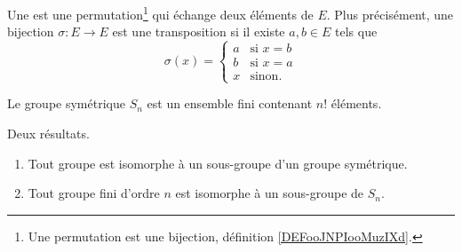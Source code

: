 \begin{definition}      \label{DEFooXNAFooGTbTTJ}
    Une  est une permutation\footnote{Une permutation est une bijection, définition \ref{DEFooJNPIooMuzIXd}.} qui échange deux éléments de \( E\). Plus précisément, une bijection \( \sigma\colon E\to E\) est une transposition si il existe \( a,b\in E\) tels que
    \begin{equation}
        \sigma(x)=\begin{cases}
              a  &   \text{si } x=b\\
            b    &   \text{si } x=a\\
            x    &    \text{sinon. }
        \end{cases}
    \end{equation}
\end{definition}

\begin{lemma}        \label{LEMooSGWKooKFIDyT}
    Le groupe symétrique \( S_n\) est un ensemble fini contenant \( n!\) éléments.
\end{lemma}

\begin{lemma}        \label{LEMooUPBOooWbwMTx}
    Deux résultats.
    \begin{enumerate}
        \item
            Tout groupe est isomorphe à un sous-groupe d'un groupe symétrique.
        \item
            Tout groupe fini d'ordre \( n\) est isomorphe à un sous-groupe de \( S_n\).
    \end{enumerate}
\end{lemma}

